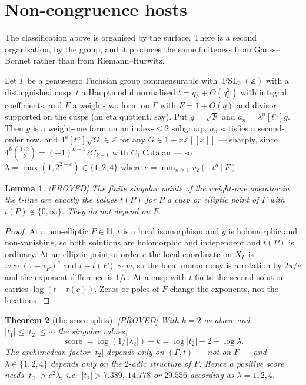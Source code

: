 \documentclass[11pt,reqno]{amsart}
\theoremstyle{plain}
\newtheorem{theorem}{Theorem}[section]
\newtheorem{lemma}[theorem]{Lemma}
\theoremstyle{definition}
\theoremstyle{remark}
\theoremstyle{plain}
\newcommand{\Z}{\mathbb{Z}}
\newcommand{\HH}{\mathbb{H}}
\DeclareMathOperator{\PSL}{PSL}
\newcommand{\Proved}{\textup{\textsf{[PROVED]}}}
\begin{document}
\section{Non-congruence hosts}\label{sec:noncong}

The classification above is organised by the surface. There is a second
organisation, by the group, and it produces the same finiteness from
Gauss--Bonnet rather than from Riemann--Hurwitz.

Let $\Gamma$ be a genus-zero Fuchsian group commensurable with $\PSL_2(\Z)$ with
a distinguished cusp, $t$ a Hauptmodul normalised $t=q_h+O(q_h^2)$ with integral
coefficients, and $F$ a weight-two form on $\Gamma$ with $F=1+O(q)$ and divisor
supported on the cusps (an eta quotient, say). Put $g=\sqrt F$ and
$a_n=\lambda^n[t^n]g$. Then $g$ is a weight-one form on an index-$\le2$ subgroup,
$a_n$ satisfies a second-order row, and $4^n[t^n]\sqrt G\in\Z$ for any
$G\in1+x\Z[[x]]$ --- sharply, since $4^k\binom{1/2}k=(-1)^{k-1}2C_{k-1}$ with
$C_j$ Catalan --- so $\lambda=\max(1,2^{2-e})\in\{1,2,4\}$ where
$e=\min_{n\ge1}v_2([t^n]F)$.

\begin{lemma}\label{lem:singpts}
\Proved{} The finite singular points of the weight-one operator in the $t$-line
are exactly the values $t(P)$ for $P$ a cusp or elliptic point of $\Gamma$ with
$t(P)\notin\{0,\infty\}$. They do \emph{not} depend on $F$.
\end{lemma}

\begin{proof}
At a non-elliptic $P\in\HH$, $t$ is a local isomorphism and $g$ is holomorphic
and non-vanishing, so both solutions are holomorphic and independent and $t(P)$
is ordinary. At an elliptic point of order $e$ the local coordinate on
$X_\Gamma$ is $w\sim(\tau-\tau_P)^e$ and $t-t(P)\sim w$, so the local monodromy
is a rotation by $2\pi/e$ and the exponent difference is $1/e$. At a cusp with
$t$ finite the second solution carries $\log(t-t(c))$. Zeros or poles of $F$
change the exponents, not the locations.
\end{proof}

\begin{theorem}[the score splits]\label{thm:N1}
\Proved{} With $k=2$ as above and $|t_1|\le|t_2|\le\cdots$ the singular values,
\[
\operatorname{score}=\log(1/|\lambda_2|)-k=\log|t_2|-2-\log\lambda .
\]
The archimedean factor $|t_2|$ depends only on $(\Gamma,t)$ --- not on $F$ --- and
$\lambda\in\{1,2,4\}$ depends only on the $2$-adic structure of $F$. Hence a
positive score needs $|t_2|>e^2\lambda$, i.e.\ $|t_2|>7.389$, $14.778$ or
$29.556$ according as $\lambda=1,2,4$.
\end{theorem}
\end{document}
